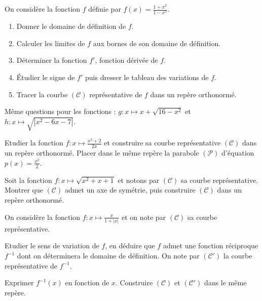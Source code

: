      \begin{exo}
\label{exo:fn etudes}
            On consid\`ere la fonction $f$ d\'efinie par $f(x) = \frac{1+x^2}{1-x^2}$.
            \begin{enumerate}
                  \item Donner le domaine de d\'efinition de $f$.
                  \item Calculer les limites de $f$ aux bornes de son domaine de d\'efinition.
                  \item D\'eterminer la fonction $f'$, fonction d\'eriv\'ee de $f$.
                  \item \'Etudier le signe de $f'$ puis dresser le tableau des variations de $f$.
                  \item Tracer la courbe $(\mathscr{C})$ repr\'esentative de $f$ dans un rep\`ere orthonorm\'e.
            \end{enumerate}
            M\^eme questions pour les fonctions : $g:x\mapsto x+\sqrt{16-x^2} $ et $h:x\mapsto\sqrt{|x^2-6x-7|}$.
      \end{exo}
%
      \begin{exo}
\label{exo:fn parabole}
            Etudier la fonction $f : x \mapsto \frac{x^3 + 2}{2x}$ et 
            construire sa courbe repr\'esentative $(\mathscr{C})$ dans un rep\`ere orthonorm\'e.
            Placer dans le m\^eme rep\`ere la parabole $(\mathscr{P})$ d'\'equation $p(x) = \frac{x^2}{2}$.
      \end{exo}
%
      \begin{exo}
\label{exo:fn axe sym}
            Soit la fonction $f : x \mapsto \sqrt{x^2 + x + 1}$ et notons par $(\mathscr{C})$ sa courbe repr\'esentative.
            Montrer que $(\mathscr{C})$ admet un axe de sym\'etrie, puis construire $(\mathscr{C})$ dans un rep\`ere orthonorm\'e.
      \end{exo}
%
      \begin{exo}
\label{exo:fn recip abs}
            On consid\`ere la fonction $f:x\mapsto \frac{x}{1+|x|}$ et on note par $(\mathscr{C})$ sa courbe repr\'esentative.

            Etudier le sens de variation de $f$, 
            en d\'eduire que $f$ admet une fonction r\'eciproque $f^{-1}$ dont on d\'eterminera le domaine de d\'efinition.
            On note par $(\mathscr{C}')$ la courbe repr\'esentative de $f^{-1}$.
            
            Exprimer $f^{-1} (x)$ en fonction de $x$.
            Construire $(\mathscr{C})$ et $(\mathscr{C}')$ dans le m\^eme rep\`ere.
      \end{exo}
